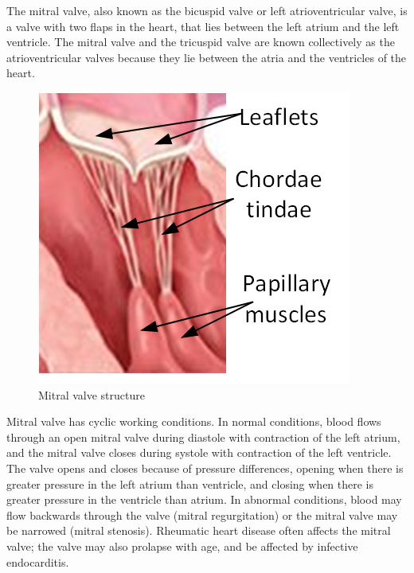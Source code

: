 The mitral valve, also known as the bicuspid valve or left atrioventricular
valve, is a valve with two flaps in the heart, that lies between the left atrium
and the left ventricle. The mitral valve and the tricuspid valve are known
collectively as the atrioventricular valves because they lie between the atria
and the ventricles of the heart.\par
\begin{figure}[H]
  \centering
  \includegraphics[width=0.4\columnwidth]{./fig/mt.png}
  \caption{Mitral valve structure}
  \label{fig:MT}
\end{figure}
Mitral valve has cyclic working conditions.
In normal conditions, blood flows through an open mitral valve during diastole
with contraction of the left atrium, and the mitral valve closes during systole
with contraction of the left ventricle. The valve opens and closes because of
pressure differences, opening when there is greater pressure in the left atrium
than ventricle, and closing when there is greater pressure in the ventricle than
atrium. In abnormal conditions, blood may flow backwards through the valve
(mitral regurgitation) or the mitral valve may be narrowed (mitral stenosis).
Rheumatic heart disease often affects the mitral valve; the valve may also
prolapse with age, and be affected by infective endocarditis.
